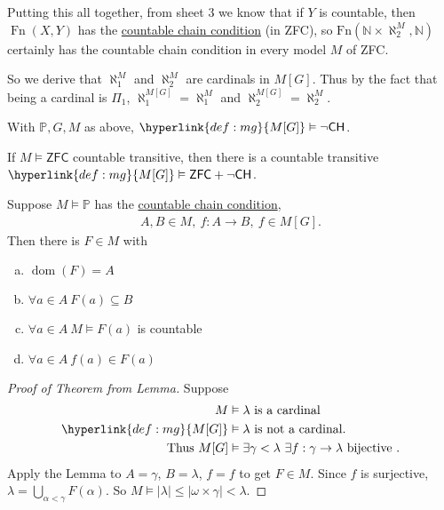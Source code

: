 \documentclass{article}
\newcommand{\p}{\mathbb{P}}
\newcommand{\1}{\mathbbm{1}}
\DeclareMathOperator{\dom}{dom}
\let\models\vDash
\begin{document}
Putting this all together, from sheet 3 we know that if $Y$ is countable, then $\operatorname{Fn}(X,Y)$ has the \hyperlink{def:ccc}{countable chain condition} (in \textsf{ZFC}), so $\text{Fn}(\mathbb{N} \times \aleph_2^M, \mathbb{N})$ certainly has the countable chain condition in every model $M$ of \textsf{ZFC}.

So we derive that $\aleph_1^M$ and $\aleph_2^M$ are cardinals in $M[G]$.
Thus by the fact that being a cardinal is $\Pi_1$, $\aleph_1^{M[G]} = \aleph_1^M$ and $\aleph_2^{M[G]} = \aleph_2^M$.

\begin{cor}
  With $\p ,G,M$ as above, $\hyperlink{def:mg}{M[G]} \models \neg \textsf{CH}$.
\end{cor}
\begin{cor}
  If $M \models \textsf{ZFC}$ countable transitive, then there is a countable transitive $\hyperlink{def:mg}{M[G]} \models \textsf{ZFC} + \neg \textsf{CH}$.
\end{cor}
\begin{lemma}
  Suppose $M \models \p$ has the \hyperlink{def:ccc}{countable chain condition},
  \begin{align*}
    A,B \in M,\ f: A \to B, \ f \in M[G].
  \end{align*}
  Then there is $F \in M$ with
  \begin{enumerate}[(a)]
    \item $\dom(F) = A$
    \item $\forall a \in A \ F(a) \subseteq B$
    \item $\forall a \in A \ M \models F(a)$ is countable
    \item $\forall a \in A \ f(a) \in F(a)$
  \end{enumerate}
\end{lemma}
\begin{proof}[Proof of Theorem from Lemma]
  Suppose
  \begin{align*}
    M &\models \lambda \text{ is a cardinal} \\
    \hyperlink{def:mg}{M[G]} &\models \lambda \text{ is not a cardinal.} \\
  \text{Thus }M[G] &\models \exists \gamma < \lambda \ \exists f: \gamma \to \lambda \text{ bijective }.
  \end{align*}
  Apply the Lemma to $A = \gamma$, $B = \lambda$, $f = f$ to get $F \in M$. Since $f$ is surjective, $\lambda = \bigcup_{\alpha < \gamma} F(\alpha)$.
  So $M \models |\lambda| \leq |\omega \times \gamma| < \lambda$.
\end{proof}
\end{document}
